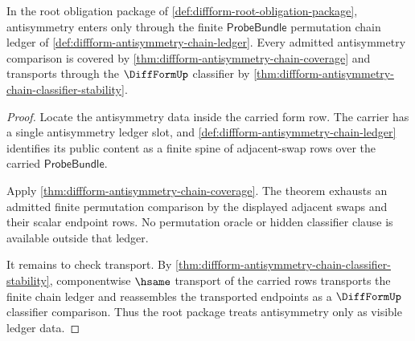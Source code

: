 \begin{theorem}
\label{thm:diffform-root-antisymmetry-ledger-obligation}
In the root obligation package of
\autoref{def:diffform-root-obligation-package}, antisymmetry enters only
through the finite $\mathsf{ProbeBundle}$ permutation chain ledger of
\autoref{def:diffform-antisymmetry-chain-ledger}. Every admitted
antisymmetry comparison is covered by
\autoref{thm:diffform-antisymmetry-chain-coverage} and transports through the
$\DiffFormUp$ classifier by
\autoref{thm:diffform-antisymmetry-chain-classifier-stability}.
\end{theorem}
\begin{proof}
Locate the antisymmetry data inside the carried form row. The carrier has a
single antisymmetry ledger slot, and
\autoref{def:diffform-antisymmetry-chain-ledger} identifies its public
content as a finite spine of adjacent-swap rows over the carried
$\mathsf{ProbeBundle}$.

Apply \autoref{thm:diffform-antisymmetry-chain-coverage}. The theorem
exhausts an admitted finite permutation comparison by the displayed adjacent
swaps and their scalar endpoint rows. No permutation oracle or hidden
classifier clause is available outside that ledger.

It remains to check transport. By
\autoref{thm:diffform-antisymmetry-chain-classifier-stability}, componentwise
$\hsame$ transport of the carried rows transports the finite chain ledger and
reassembles the transported endpoints as a $\DiffFormUp$ classifier
comparison. Thus the root package treats antisymmetry only as visible ledger
data.
\end{proof}

